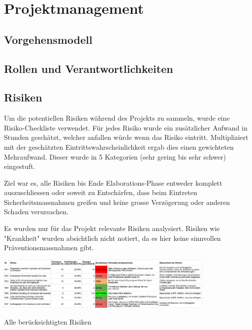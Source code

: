 \part{Projektmanagement}

\chapter{Vorgehensmodell}

\xxx

\chapter{Rollen und Verantwortlichkeiten}

\xxx

\chapter{Risiken}\label{sec:risiken}

Um die potentiellen Risiken während des Projekts zu sammeln, wurde eine  Risiko-Checkliste verwendet. Für jedes Risiko wurde ein zusätzlicher Aufwand in Stunden geschätzt, welcher anfallen würde wenn das Risiko eintritt. Multipliziert mit der geschätzten Eintrittswahrscheinlichkeit ergab dies einen gewichteten Mehraufwand. Dieser wurde in 5 Kategorien (sehr gering bis sehr schwer) eingestuft.

Ziel war es, alle Risiken bis Ende Elaborations-Phase entweder komplett auszuschliessen oder soweit zu Entschärfen, dass beim Eintreten Sicherheitsmassnahmen greifen und keine grosse Verzögerung oder anderen Schaden verursachen.

Es wurden nur für das Projekt relevante Risiken analysiert. Risiken wie "Krankheit" wurden absichtlich nicht notiert, da es hier keine sinnvollen Präventionsmassnahmen gibt.


\begin{landscape}
	\begin{table}[H]
		\centering
		\includegraphics[width=0.8\textwidth,keepaspectratio]{Risikoanalyse.pdf}
		\caption{Alle berücksichtigten Risiken}
		\label{tab:risikoanalyse}
	\end{table}
\end{landscape}

